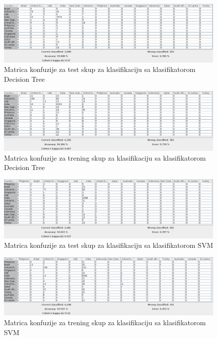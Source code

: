 \documentclass[11pt]{article} %
\begin{document}
\begin{figure}[h!]
	\centering
	\includegraphics[width=1.1\textwidth]{countryClassificationTest/DecisionTree}
	\caption{Matrica konfuzije za test skup za klasifikaciju sa klasifikatorom Decision Tree}
\end{figure}
\begin{figure}[h!]
	\centering
	\includegraphics[width=1.1\textwidth]{countryClassificationTraining/DecisionTree}
	\caption{Matrica konfuzije za trening skup za klasifikaciju sa klasifikatorom Decision Tree}
\end{figure}
\newline
\begin{figure}[h!]
	\centering
	\includegraphics[width=1.1\textwidth]{countryClassificationTest/SVM}
	\caption{Matrica konfuzije za test skup za klasifikaciju sa klasifikatorom SVM}
\end{figure}
\begin{figure}[h!]
	\centering
	\includegraphics[width=1.1\textwidth]{countryClassificationTraining/SVM}
	\caption{Matrica konfuzije za trening skup za klasifikaciju sa klasifikatorom SVM}
\end{figure}
\end{document}
